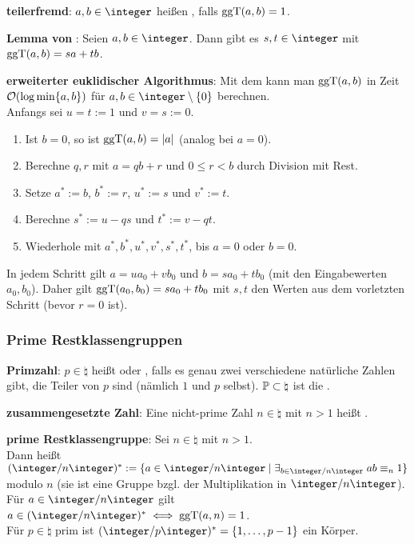 \textbf{teilerfremd}:
$a, b \in \integer$ heißen , falls $\operatorname{ggT}(a, b) = 1$.

\textbf{Lemma von }:
Seien $a, b \in \integer$.
Dann gibt es $s, t \in \integer$ mit
$\operatorname{ggT}(a, b) = sa + tb$.

\textbf{erweiterter euklidischer Algorithmus}:
Mit dem  kann man $\operatorname{ggT}(a, b)$ in Zeit
$\mathcal{O}(\log \min\{a, b\})$ für $a, b \in \integer \setminus \{0\}$ berechnen.\\
Anfangs sei $u = t := 1$ und $v = s := 0$.
\begin{enumerate}
    \item
    Ist $b = 0$, so ist $\operatorname{ggT}(a, b) = |a|$ (analog bei $a = 0$).

    \item
    Berechne $q, r$ mit $a = qb + r$ und $0 \le r < b$ durch Division mit Rest.

    \item
    Setze $a^\ast := b$, $b^\ast := r$, $u^\ast := s$ und $v^\ast := t$.

    \item
    Berechne $s^\ast := u - qs$ und $t^\ast := v - qt$.

    \item
    Wiederhole mit $a^\ast, b^\ast, u^\ast, v^\ast, s^\ast, t^\ast$,
    bis $a = 0$ oder $b = 0$.
\end{enumerate}
In jedem Schritt gilt $a = ua_0 + vb_0$ und $b = sa_0 + tb_0$
(mit den Eingabewerten $a_0, b_0$).
Daher gilt $\operatorname{ggT}(a_0, b_0) = sa_0 + tb_0$ mit $s, t$ den Werten aus dem vorletzten Schritt
(bevor $r = 0$ ist).


\pagebreak

\subsubsection{%
    Prime Restklassengruppen%
}

\textbf{Primzahl}:
$p \in \natural$ heißt  oder , falls es genau zwei verschiedene
natürliche Zahlen gibt, die Teiler von $p$ sind (nämlich $1$ und $p$ selbst).
$\mathbb{P} \subset \natural$ ist die .

\textbf{zusammengesetzte Zahl}:
Eine nicht-prime Zahl $n \in \natural$ mit $n > 1$ heißt .

\textbf{prime Restklassengruppe}:
Sei $n \in \natural$ mit $n > 1$.\\
Dann heißt $(\ZnZ)^\ast := \{a \in \ZnZ \;|\; \exists_{b \in \ZnZ}\; ab \equiv_n 1\}$
 modulo $n$
(sie ist eine Gruppe bzgl. der Multiplikation in $\ZnZ$).\\
Für $a \in \ZnZ$ gilt $a \in (\ZnZ)^{\ast} \iff \ggT(a, n) = 1$.\\
Für $p \in \natural$ prim ist $(\ZpZ)^\ast = \{1, \dotsc, p-1\}$ ein Körper.

